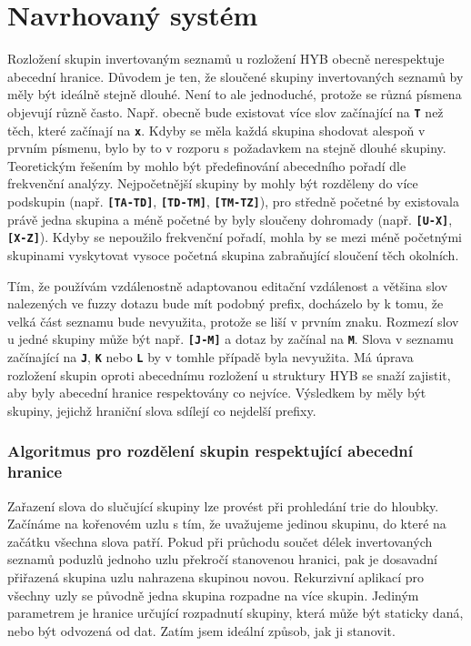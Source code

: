 \documentclass[11pt,letterpaper,oneside,openright]{book}
\newcommand{\bftt}[1]{\texttt{\textbf{#1}}}
\begin{document}
\section{Navrhovaný systém}
Rozložení skupin invertovaným seznamů u rozložení HYB
obecně nerespektuje abecední hranice. Důvodem je ten, že sloučené skupiny
invertovaných seznamů by měly být ideálně stejně dlouhé. Není to ale
jednoduché, protože se různá písmena objevují různě často. Např. obecně bude
existovat více slov začínající na \bftt{T} než těch, které začínají na
\bftt{x}. Kdyby se měla každá skupina shodovat alespoň v prvním písmenu, bylo
by to v rozporu s požadavkem na stejně dlouhé skupiny. Teoretickým řešením by
mohlo být předefinování abecedního pořadí dle frekvenční analýzy. Nejpočetnější
skupiny by mohly být rozděleny do více podskupin (např. \bftt{[TA-TD]},
\bftt{[TD-TM]}, \bftt{[TM-TZ]}), pro středně početné by existovala právě jedna
skupina a méně početné by byly sloučeny dohromady (např. \bftt{[U-X]},
\bftt{[X-Z]}). Kdyby se nepoužilo frekvenční pořadí, mohla by se mezi méně
početnými skupinami vyskytovat vysoce početná skupina zabraňující sloučení těch
okolních.

Tím, že používám vzdálenostně adaptovanou editační vzdálenost a většina slov
nalezených ve fuzzy dotazu bude mít podobný prefix, docházelo by k tomu, že
velká část seznamu bude nevyužita, protože se liší v prvním znaku. Rozmezí slov
u jedné skupiny může být např. \bftt{[J-M]} a dotaz by začínal na \bftt{M}. Slova v
seznamu začínající na \bftt{J}, \bftt{K} nebo \bftt{L} by v tomhle případě byla
nevyužita. Má úprava rozložení skupin oproti abecednímu rozložení u struktury
HYB se snaží zajistit, aby byly abecední hranice respektovány co nejvíce.
Výsledkem by měly být skupiny, jejichž hraniční slova sdílejí co nejdelší
prefixy.

\subsubsection{Algoritmus pro rozdělení skupin respektující abecední hranice}
Zařazení slova do slučující skupiny lze provést při prohledání trie do hloubky.
Začínáme na kořenovém uzlu s tím, že uvažujeme jedinou skupinu, do které na
začátku všechna slova patří. Pokud při průchodu součet délek invertovaných
seznamů poduzlů jednoho uzlu překročí stanovenou hranici, pak je dosavadní
přiřazená skupina uzlu nahrazena skupinou novou. Rekurzivní aplikací pro
všechny uzly se původně jedna skupina rozpadne na více skupin. Jediným
parametrem je hranice určující rozpadnutí skupiny, která může být staticky
daná, nebo být odvozená od dat. Zatím jsem ideální způsob, jak ji stanovit.
\end{document}
